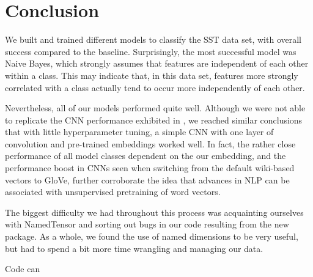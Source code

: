 \documentclass[11pt]{article}
\begin{document}


\section{Conclusion}

We built and trained different models to classify the SST data set, with overall success compared to the baseline. Surprisingly, the most successful model was Naive Bayes, which strongly assumes that features are independent of each other within a class. This may indicate that, in this data set, features more strongly correlated with a class actually tend to occur more independently of each other.

Nevertheless, all of our models performed quite well. Although we were not able to replicate the CNN performance exhibited in \citet{DBLP:journals/corr/Kim14f}, we reached similar conclusions that with little hyperparameter tuning, a simple CNN with one layer of convolution and pre-trained embeddings worked well. In fact, the rather close performance of all model classes dependent on the our embedding, and the performance boost in CNNs seen when switching from the default wiki-based vectors to GloVe, further corroborate the idea that advances in NLP can be associated with unsupervised pretraining of word vectors. 


The biggest difficulty we had throughout this process was acquainting ourselves with NamedTensor and sorting out bugs in our code resulting from the new package.  As a whole, we found the use of named dimensions to be very useful, but had to spend a bit more time wrangling and managing our data.

Code can 



\end{document}
